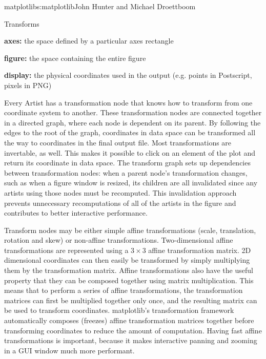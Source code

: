 \begin{aosachapter}{matplotlib}{s:matplotlib}{John Hunter and Michael Droettboom}
\begin{aosasect1}{Transforms}
\begin{aosaitemize}
\item \textbf{axes:} the space defined by a particular axes rectangle

\item \textbf{figure:} the space containing the entire figure

\item \textbf{display:} the physical coordinates used in the output
  (e.g. points in Postscript, pixels in PNG)
\end{aosaitemize}

Every Artist has a transformation node that knows how to transform
from one coordinate system to another.  These transformation nodes are
connected together in a directed graph, where each node is dependent
on its parent.  By following the edges to the root of the graph,
coordinates in data space can be transformed all the way to
coordinates in the final output file.  Most transformations are
invertable, as well.  This makes it possible to click on an element of
the plot and return its coordinate in data space.  The transform graph
sets up dependencies between transformation nodes: when a parent
node's transformation changes, such as when a figure window is
resized, its children are all invalidated since any artists using
those nodes must be recomputed.  This invalidation approach prevents
unnecessary recomputations of all of the artists in the figure and
contributes to better interactive performance.

Transform nodes may be either simple affine transformations (scale,
translation, rotation and skew) or non-affine transformations.
Two-dimensional affine transformations are represented using a $3
\times 3$ affine transformation matrix.  2D dimensional coordinates
can then easily be transformed by simply multiplying them by the
transformation matrix.  Affine transformations also have the useful
property that they can be composed together using matrix
multiplication.  This means that to perform a series of affine
transformations, the transformation matrices can first be multiplied
together only once, and the resulting matrix can be used to transform
coordinates.  matplotlib's transformation framework automatically
composes (freezes) affine transformation matrices together before
transforming coordinates to reduce the amount of computation.  Having
fast affine transformations is important, because it makes interactive
panning and zooming in a GUI window much more performant.


\end{aosasect1}
\end{aosachapter}
